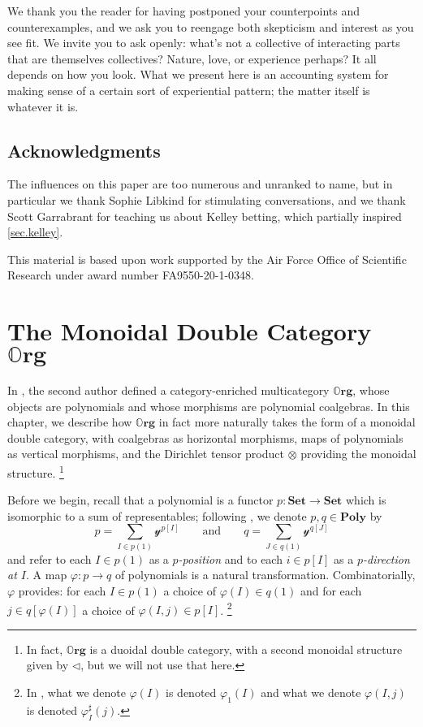 \documentclass[11pt, one side, article]{memoir}
\theoremstyle{definition}
\theoremstyle{plain}
\newcommand{\Cat}[1]{\mathbf{#1}}%
\newcommand{\smset}{\Cat{Set}}
\newcommand{\yon}{\mathcal{y}}
\newcommand{\poly}{\Cat{Poly}}
\newcommand{\0}{\textsf{0}}
\newcommand{\1}{\tn{\textsf{1}}}
\newcommand{\tri}{\mathbin{\triangleleft}}
\newcommand{\qqand}{\qquad\text{and}\qquad}
\newcommand{\org}{{\mathbb{O}\Cat{rg}}}
\begin{document}
We thank you the reader for having postponed your counterpoints and counterexamples, and we ask you to reengage both skepticism and interest as you see fit. We invite you to ask openly: what's not a collective of interacting parts that are themselves collectives? Nature, love, or experience perhaps? It all depends on how you look. What we present here is an accounting system for making sense of a certain sort of experiential pattern; the matter itself is whatever it is.

\section{Acknowledgments}

The influences on this paper are too numerous and unranked to name, but in particular we thank Sophie Libkind for stimulating conversations, and we thank Scott Garrabrant for teaching us about Kelley betting, which partially inspired \cref{sec.kelley}.

This material is based upon work supported by the Air Force Office of Scientific Research under award number FA9550-20-1-0348.


\chapter{The Monoidal Double Category $\org$}\label{chap.org}

In \cite{spivak2021learners}, the second author defined a category-enriched multicategory $\org$, whose objects are polynomials and whose morphisms are polynomial coalgebras. In this chapter, we describe how $\org$ in fact more naturally takes the form of a monoidal double category, with coalgebras as horizontal morphisms, maps of polynomials as vertical morphisms, and the Dirichlet tensor product $\otimes$ providing the monoidal structure.%
\footnote{In fact, $\org$ is a duoidal double category, with a second monoidal structure given by $\tri$, but we will not use that here.}

Before we begin, recall that a polynomial is a functor $p\colon \smset\to\smset$ which is isomorphic to a sum of representables; following \cite{spivak2021learners}, we denote $p,q\in\poly$ by
\begin{equation}\label{eqn.poly_notation}
p = \sum_{I \in p(1)} \yon^{p[I]} \qqand q = \sum_{J \in q(1)} \yon^{q[J]}
\end{equation}
and refer to each $I\in p(1)$ as a \emph{$p$-position} and to each $i\in p[I]$ as a \emph{$p$-direction at $I$}. A map $\varphi\colon p\to q$ of polynomials is a natural transformation. Combinatorially, $\varphi$ provides: for each $I\in p(1)$ a choice of $\varphi(I)\in q(1)$ and for each $j\in q[\varphi(I)]$ a choice of $\varphi(I,j)\in p[I]$.%
\footnote{In \cite{spivak2021learners}, what we denote $\varphi(I)$ is denoted $\varphi_1(I)$ and what we denote $\varphi(I,j)$ is denoted $\varphi^\sharp_I(j)$.}
\end{document}
